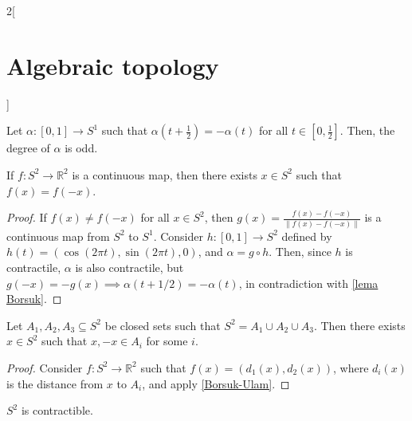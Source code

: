 \documentclass[../../../main_math.tex]{subfiles}
\begin{document}
\begin{multicols}{2}[\section{Algebraic topology}]
  \begin{lemma} \label{lema Borsuk}
    Let $\alpha:[0,1]\to S^1$ such that $\alpha(t+\frac{1}{2})=-\alpha(t)$ for all $t\in[0,\frac{1}{2}]$. Then, the degree of $\alpha$ is odd.
  \end{lemma}

  \begin{theorem}
    \label{Borsuk-Ulam}
    If $f:S^2 \to \mathbb{R}^2$ is a continuous map, then there exists $x\in S^2$ such that $f(x)=f(-x)$.
  \end{theorem}

  \begin{proof}
    If $f(x)\neq f(-x)$ for all $x\in S^2$, then $g(x)=\frac{f(x)-f(-x)}{\|f(x)-f(-x)\|}$ is a continuous map from $S^2$ to $S^1$. Consider $h:[0,1] \to S^2$ defined by $h(t)=(\cos(2\pi t), \sin(2\pi t), 0)$, and $\alpha = g \circ h$. Then, since $h$ is contractile, $\alpha$ is also contractile, but $g(-x)=-g(x)\implies \alpha(t+1/2)=-\alpha(t)$, in contradiction with \cref{lema Borsuk}.
  \end{proof}

  \begin{corollary}
    Let $A_1, A_2, A_3\subseteq S^2$ be closed sets such that $S^2=A_1\cup A_2 \cup A_3$. Then there exists $x\in S^2$ such that $x,-x \in A_i$ for some $i$.
  \end{corollary}

  \begin{proof}
    Consider $f: S^2 \to \mathbb{R}^2$ such that $f(x)=(d_1(x), d_2(x))$, where $d_i(x)$ is the distance from $x$ to $A_i$, and apply \cref{Borsuk-Ulam}.
  \end{proof}

  \begin{proposition}
    $S^2$ is contractible.
  \end{proposition}


\end{multicols}
\end{document}
